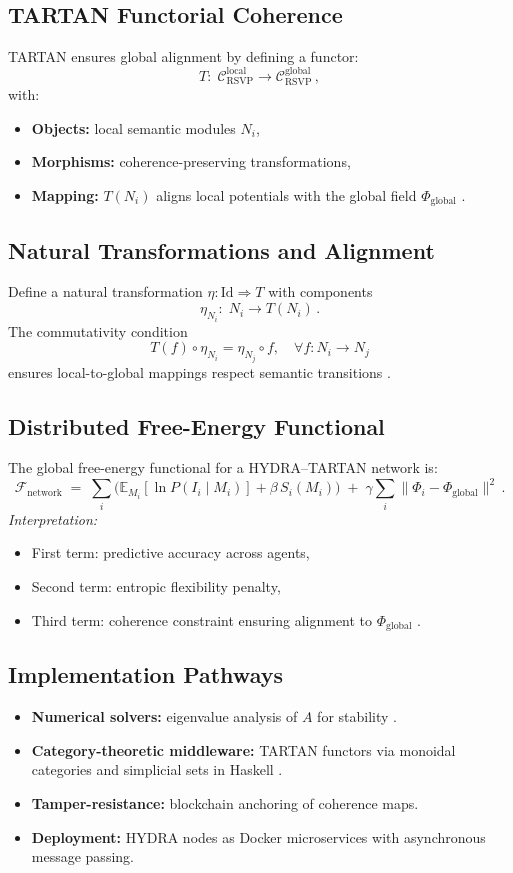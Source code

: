 \documentclass[12pt]{article}
\begin{document}
\subsection*{TARTAN Functorial Coherence}
TARTAN ensures global alignment by defining a functor:
\[
T:\; \mathcal{C}_{\text{RSVP}}^{\text{local}} \longrightarrow \mathcal{C}_{\text{RSVP}}^{\text{global}} \, ,
\]
with:
\begin{itemize}
  \item \textbf{Objects:} local semantic modules \(N_i\),
  \item \textbf{Morphisms:} coherence-preserving transformations,
  \item \textbf{Mapping:} \(T(N_i)\) aligns local potentials with the global field \(\Phi_{\text{global}}\) \citep{maclane1998}.
\end{itemize}

\subsection*{Natural Transformations and Alignment}
Define a natural transformation \(\eta: \mathrm{Id} \Rightarrow T\) with components
\[
\eta_{N_i}:\; N_i \to T(N_i) \, .
\]
The commutativity condition
\[
T(f)\circ \eta_{N_i} = \eta_{N_j}\circ f, \quad \forall f:N_i \to N_j
\]
ensures local-to-global mappings respect semantic transitions \citep{lawvere2009, may1999}.

\subsection*{Distributed Free-Energy Functional}
The global free-energy functional for a HYDRA–TARTAN network is:
\[
\mathcal{F}_{\text{network}} \;=\; \sum_i \Big( \mathbb{E}_{M_i}[\ln P(I_i \mid M_i)] + \beta\, S_i(M_i) \Big)
\;+\; \gamma \sum_i \|\Phi_i - \Phi_{\text{global}}\|^2 \, .
\]
\emph{Interpretation:}
\begin{itemize}
  \item First term: predictive accuracy across agents,
  \item Second term: entropic flexibility penalty,
  \item Third term: coherence constraint ensuring alignment to \(\Phi_{\text{global}}\) \citep{friston2010}.
\end{itemize}


\subsection*{Implementation Pathways}
\begin{itemize}[leftmargin=1.2em]
  \item \textbf{Numerical solvers:} eigenvalue analysis of \(A\) for stability \citep{bird1988}.
  \item \textbf{Category-theoretic middleware:} TARTAN functors via monoidal categories and simplicial sets in Haskell \citep{milewski2018}.
  \item \textbf{Tamper-resistance:} blockchain anchoring of coherence maps.
  \item \textbf{Deployment:} HYDRA nodes as Docker microservices with asynchronous message passing.
\end{itemize}
\end{document}
